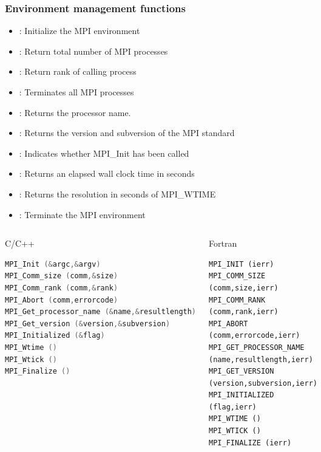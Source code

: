 \documentclass[10pt,t]{beamer}
\begin{document}
\begin{frame}
  \frametitle{Environment management functions}
  \begin{itemize}
    \item {}: Initialize the MPI environment
    \item {}: Return total number of MPI processes
    \item {}: Return rank of calling process
    \item {}: Terminates all MPI processes
    \item {}: Returns the processor name.
    \item {}: Returns the version and subversion of the MPI standard
    \item {}: Indicates whether MPI\_Init has been called
    \item {}: Returns an elapsed wall clock time in seconds
    \item {}: Returns the resolution in seconds of MPI\_WTIME
    \item {}: Terminate the MPI environment
  \end{itemize}
  \framebreak
  \vspace{-0.5cm}
  \begin{columns}
    \begin{exampleblock}{C/C++}
      \begin{lstlisting}[basicstyle=\scriptsize\ttfamily,language=C]
MPI_Init (&argc,&argv) 
MPI_Comm_size (comm,&size) 
MPI_Comm_rank (comm,&rank) 
MPI_Abort (comm,errorcode)
MPI_Get_processor_name (&name,&resultlength)
MPI_Get_version (&version,&subversion)
MPI_Initialized (&flag) 
MPI_Wtime ()
MPI_Wtick ()
MPI_Finalize ()
      \end{lstlisting}
    \end{exampleblock}
    \begin{exampleblock}{Fortran}
      \begin{lstlisting}[basicstyle=\scriptsize\ttfamily,language={[90]Fortran}]
MPI_INIT (ierr)
MPI_COMM_SIZE (comm,size,ierr)
MPI_COMM_RANK (comm,rank,ierr)
MPI_ABORT (comm,errorcode,ierr)
MPI_GET_PROCESSOR_NAME (name,resultlength,ierr)
MPI_GET_VERSION (version,subversion,ierr)
MPI_INITIALIZED (flag,ierr)
MPI_WTIME ()
MPI_WTICK ()
MPI_FINALIZE (ierr)
      \end{lstlisting}
    \end{exampleblock}
  \end{columns}
\end{frame}
\end{document}
